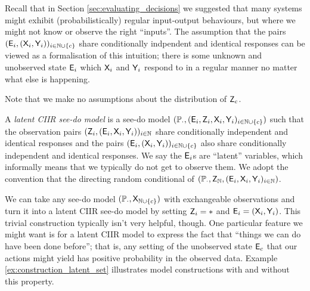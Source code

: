 Recall that in Section \ref{sec:evaluating_decisions} we suggested that many systems might exhibit (probabilistically) regular input-output behaviours, but where we might not know or observe the right ``inputs''. The assumption that the pairs $(\mathsf{E}_i,(\mathsf{X}_i,\mathsf{Y}_i))_{i\in\mathbb{N}\cup\{c\}}$ share conditionally indpendent and identical responses can be viewed as a formalisation of this intuition; there is some unknown and unobserved state $\mathsf{E}_i$ which $\mathsf{X}_i$ and $\mathsf{Y}_i$ respond to in a regular manner no matter what else is happening.

Note that we make no assumptions about the distribution of $\mathsf{Z}_c$.

\begin{definition}\label{def:lciirm}
A \emph{latent CIIR see-do model} is a see-do model $(\mathbb{P}_\cdot,(\mathsf{E}_i,\mathsf{Z}_{i},\mathsf{X}_i,\mathsf{Y}_i)_{i\in \mathbb{N}\cup\{c\}})$ such that the observation pairs $(\mathsf{Z}_{i},(\mathsf{E}_i,\mathsf{X}_i,\mathsf{Y}_i))_{i\in \mathbb{N}}$ share conditionally independent and identical responses and the pairs $(\mathsf{E}_i,(\mathsf{X}_i,\mathsf{Y}_i))_{i\in\mathbb{N}\cup\{c\}}$ also share conditionally independent and identical responses. We say the $\mathsf{E}_i$s are ``latent'' variables, which informally means that we typically do not get to observe them. We adopt the convention that the directing random conditional of $(\mathbb{P}_\cdot,\mathsf{Z}_{\mathbb{N}},(\mathsf{E}_i,\mathsf{X}_i,\mathsf{Y}_i)_{i\in \mathbb{N}})$.
\end{definition}

We can take any see-do model $(\mathbb{P}_\cdot,\mathsf{X}_{\mathbb{N}\cup\{c\}})$ with exchangeable observations and turn it into a latent CIIR see-do model by setting $\mathsf{Z}_i=*$ and $\mathsf{E}_i=(\mathsf{X}_i,\mathsf{Y}_i)$. This trivial construction typically isn't very helpful, though. One particular feature we might want is for a latent CIIR model to express the fact that ``things we can do have been done before''; that is, any setting of the unobserved state $\mathsf{E}_c$ that our actions might yield has positive probability in the observed data. Example \ref{ex:construction_latent_set} illustrates model constructions with and without this property.

